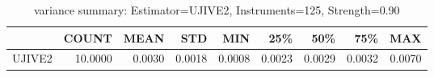 \begin{table}[ht]
\centering
\caption{variance summary: Estimator=UJIVE2, Instruments=125, Strength=0.90}
\begin{tabular}{lrrrrrrrr}
\toprule
 & COUNT & MEAN & STD & MIN & 25\% & 50\% & 75\% & MAX \\
\midrule
UJIVE2 & 10.0000 & 0.0030 & 0.0018 & 0.0008 & 0.0023 & 0.0029 & 0.0032 & 0.0070 \\
\bottomrule
\end{tabular}
\end{table}

